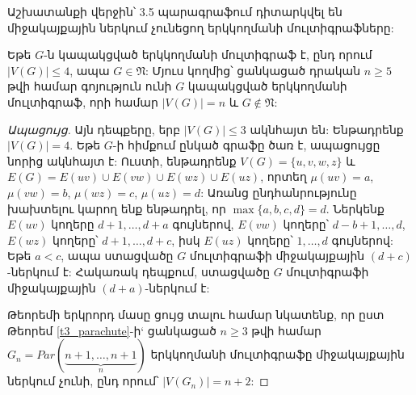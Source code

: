 Աշխատանքի վերջին՝ 3.5 պարագրաֆում դիտարկվել են միջակայքային ներկում չունեցող երկկողմանի մուլտիգրաֆները: 
\begin{theorem}
\label{t3_bipartite_multi_4} Եթե $G$-ն կապակցված երկկողմանի մուլտիգրաֆ է, ընդ որում $\vert V(G)\vert\leq 4$, ապա $G\in \mathfrak{N}$: Մյուս կողմից՝ ցանկացած դրական $n \geq 5$ թվի համար գոյություն ունի $G$ կապակցված երկկողմանի մուլտիգրաֆ, որի համար $|V(G)|=n$ և $G\notin \mathfrak{N}$:
\end{theorem}
\begin{proof}[Ապացույց]
Այն դեպքերը, երբ $\vert V(G)\vert\leq 3$ ակնհայտ են: Ենթադրենք $\vert
V(G)\vert= 4$. Եթե $G$-ի հիմքում ընկած գրաֆը ծառ է, ապացույցը նորից ակնհայտ է: Ուստի, ենթադրենք $V(G)=\{u,v,w,z\}$ և
$E(G)=E(uv)\cup E(vw)\cup E(wz)\cup E(uz)$, որտեղ $\mu(uv)=a$,
$\mu(vw)=b$, $\mu(wz)=c$, $\mu(uz)=d$: Առանց ընդհանրությունը խախտելու կարող ենք ենթադրել, որ ${\max} \{a,b,c,d\}=d$. Ներկենք $E(uv)$ կողերը
$d+1,\ldots,d+a$ գույներով, $E(vw)$ կողերը՝ 
$d-b+1,\ldots,d$, $E(wz)$ կողերը՝ $d+1,\ldots,d+c$,
իսկ $E(uz)$ կողերը՝ $1,\ldots,d$ գույներով: Եթե $a<c$, ապա ստացվածը $G$ մուլտիգրաֆի միջակայքային $(d+c)$-ներկում է: Հակառակ դեպքում, ստացվածը $G$ մուլտիգրաֆի միջակայքային $(d+a)$-ներկում է:

Թեորեմի երկրորդ մասը ցույց տալու համար նկատենք, որ ըստ Թեորեմ \ref{t3_parachute}-ի` ցանկացած $n \geq 3$ թվի համար $G_n = Par(\underbrace{n+1,\ldots,n+1}_{n})$ երկկողմանի մուլտիգրաֆը միջակայքային ներկում չունի, ընդ որում՝ $|V(G_n)|=n+2$:
\end{proof}

